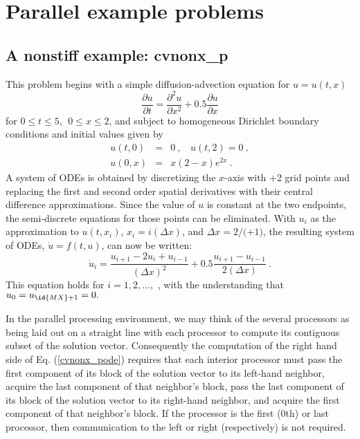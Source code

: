 \section{Parallel example problems}\label{s:ex_parallel}

\subsection{A nonstiff example: cvnonx\_p}\label{ss:cvnonx_p}

This problem begins with a simple diffusion-advection equation
for $u=u(t,x)$
\begin{equation}
\frac{\partial u}{\partial t}=\frac{\partial ^{2}u}{\partial x^{2}}
   + 0.5\frac{\partial u}{\partial x}  \label{PDE1}
\end{equation}
for $0 \leq t \leq 5, ~~ 0\leq x \leq 2$, and subject to homogeneous
Dirichlet boundary conditions and initial values given by 
\begin{eqnarray}
u(t,0) &=& 0 ~,~~~~u(t,2) = 0 ~, \label{BCIC1} \\
u(0,x) &=& x(2-x)e^{2x} ~. \nonumber
\end{eqnarray}
A system of  ODEs is obtained by discretizing the $x$-axis with +2
grid points and replacing the first and second order spatial derivatives
with their central difference approximations. Since the value of $u$ is
constant at the two endpoints, the semi-discrete equations for those points
can be eliminated.  With $u_{i}$ as the approximation to $u(t,x_{i})$, 
$x_{i} = i(\Delta x)$, and $\Delta x = 2/($$+1)$, the resulting system of
ODEs, $\dot{u} = f(t,u)$, can now be written:
\begin{equation}
\dot{u}_i=\frac{u_{i+1}-2u_{i}+u_{i-1}}{(\Delta x)^{2}}
  + 0.5 \frac{u_{i+1}-u_{i-1}}{2(\Delta x)} ~. \label{cvnonx_pode}
\end{equation}
This equation holds for $i=1,2,\ldots ,$ , with the understanding
that $u_{0} = u_{\id{MX}+1}=0.$

In the parallel processing environment, we may think of the several
processors as being laid out on a straight line with each processor to
compute its contiguous subset of the solution vector.  Consequently
the computation of the right hand side of Eq. (\ref{cvnonx_pode}) requires
that each interior processor must pass the first component of its block of
the solution vector to its left-hand neighbor, acquire the last component of
that neighbor's block, pass the last component of its block of the solution
vector to its right-hand neighbor, and acquire the first component of that
neighbor's block. If the processor is the first ($0$th) or last processor,
then communication to the left or right (respectively) is not required.

